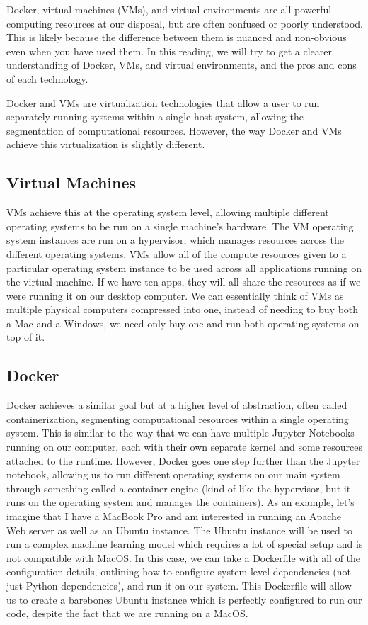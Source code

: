 {{{{{    Docker, virtual machines (VMs), and virtual environments are all powerful computing resources at our disposal, but are often confused or poorly understood. This is likely because the difference between them is nuanced and non-obvious even when you have used them. In this reading, we will try to get a clearer understanding of Docker, VMs, and virtual environments, and the pros and cons of each technology.
    
    Docker and VMs are virtualization technologies that allow a user to run separately running systems within a single host system, allowing the segmentation of computational resources. However, the way Docker and VMs achieve this virtualization is slightly different.
    
    \subsection{Virtual Machines}
    
    VMs achieve this at the operating system level, allowing multiple different operating systems to be run on a single machine's hardware. The VM operating system instances are run on a hypervisor, which manages resources across the different operating systems. VMs allow all of the compute resources given to a particular operating system instance to be used across all applications running on the virtual machine. If we have ten apps, they will all share the resources as if we were running it on our desktop computer. We can essentially think of VMs as multiple physical computers compressed into one, instead of needing to buy both a Mac and a Windows, we need only buy one and run both operating systems on top of it.
    
    \subsection{Docker}
    
    Docker achieves a similar goal but at a higher level of abstraction, often called containerization, segmenting computational resources within a single operating system. This is similar to the way that we can have multiple Jupyter Notebooks running on our computer, each with their own separate kernel and some resources attached to the runtime. However, Docker goes one step further than the Jupyter notebook, allowing us to run different operating systems on our main system through something called a container engine (kind of like the hypervisor, but it runs on the operating system and manages the containers). As an example, let’s imagine that I have a MacBook Pro and am interested in running an Apache Web server as well as an Ubuntu instance. The Ubuntu instance will be used to run a complex machine learning model which requires a lot of special setup and is not compatible with MacOS. In this case, we can take a Dockerfile with all of the configuration details, outlining how to configure system-level dependencies (not just Python dependencies), and run it on our system. This Dockerfile will allow us to create a barebones Ubuntu instance which is perfectly configured to run our code, despite the fact that we are running on a MacOS.
    
}}}}}

